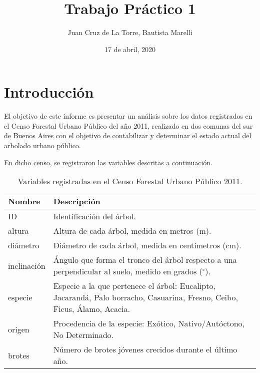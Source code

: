 \documentclass[titlepage, 12pt]{article}
\begin{document}
\title{Trabajo Práctico 1}
\author{Juan Cruz de La Torre, Bautista Marelli}
\date{17 de abril, 2020}

\maketitle

\tableofcontents
\newpage

\section{Introducción}
\label{sec:introduccion}

El objetivo de este informe es presentar un análisis sobre los datos registrados en el Censo Forestal Urbano Público del año 2011, realizado en dos comunas del sur de Buenos Aires con el objetivo de contabilizar y determinar el estado actual del arbolado urbano público.

En dicho censo, se registraron las variables descritas a continuación.

\begin{table}[H]
  \begin{tabularx}{\linewidth}{|l|X|}
    \hline
    \textbf{Nombre} & \textbf{Descripción}                                                                                                      \\ \hline
    ID              & Identificación del árbol.                                                                                                 \\ \hline
    altura          & Altura de cada árbol, medida en metros (m).                                                                               \\ \hline
    diámetro        & Diámetro de cada árbol, medida en centímetros (cm).                                                                       \\ \hline
    inclinación     & Ángulo que forma el tronco del árbol respecto a una perpendicular al suelo, medido en grados ($^{\circ}$).                \\ \hline
    especie         & Especie a la que pertenece el árbol: Eucalipto, Jacarandá, Palo borracho, Casuarina, Fresno, Ceibo, Ficus, Álamo, Acacia. \\ \hline
    origen          & Procedencia de la especie: Exótico, Nativo/Autóctono, No Determinado.                                                     \\ \hline
    brotes          & Número de brotes jóvenes crecidos durante el último año.                                                                  \\ \hline
  \end{tabularx}

  \caption{Variables registradas en el Censo Forestal Urbano Público 2011.}
  \label{tbl:variables}
\end{table}
\end{document}
